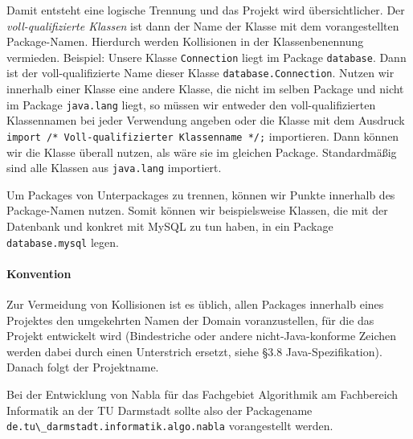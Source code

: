 		Damit entsteht eine logische Trennung und das Projekt wird übersichtlicher. Der \textit{voll-qualifizierte Klassen} ist dann der Name der Klasse mit dem vorangestellten Package-Namen. Hierdurch werden Kollisionen in der Klassenbenennung vermieden. Beispiel: Unsere Klasse \texttt{Connection} liegt im Package \texttt{database}. Dann ist der voll-qualifizierte Name dieser Klasse \texttt{database.Connection}. Nutzen wir innerhalb einer Klasse eine andere Klasse, die nicht im selben Package und nicht im Package \texttt{java.lang} liegt, so müssen wir entweder den voll-qualifizierten Klassennamen bei jeder Verwendung angeben oder die Klasse mit dem Ausdruck \lstinline|import /* Voll-qualifizierter Klassenname */;| importieren. Dann können wir die Klasse überall nutzen, als wäre sie im gleichen Package. Standardmäßig sind alle Klassen aus \lstinline{java.lang} importiert.
		
		Um Packages von Unterpackages zu trennen, können wir Punkte innerhalb des Package-Namen nutzen. Somit können wir beispielsweise Klassen, die mit der Datenbank und konkret mit MySQL zu tun haben, in ein Package \lstinline{database.mysql} legen.
		
		\paragraph{Konvention}
			Zur Vermeidung von Kollisionen ist es üblich, allen Packages innerhalb eines Projektes den umgekehrten Namen der Domain voranzustellen, für die das Projekt entwickelt wird (Bindestriche oder andere nicht-Java-konforme Zeichen werden dabei durch einen Unterstrich ersetzt, siehe §3.8 Java-Spezifikation). Danach folgt der Projektname.
			
			Bei der Entwicklung von Nabla für das Fachgebiet Algorithmik am Fachbereich Informatik an der TU Darmstadt sollte also der Packagename \lstinline|de.tu\_darmstadt.informatik.algo.nabla| vorangestellt werden.
